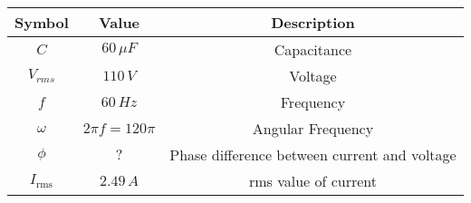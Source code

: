 \begin{tabular}{|c|c|c|}
	\hline
	\textbf{Symbol} & \textbf{Value} &
	\textbf{Description}\\[6pt]
	\hline
	$C$ &  $60\, \mu F$ & Capacitance \\[6pt]
	\hline
	$V_{rms}$ & $110\, V$ & Voltage\\[6pt]
	\hline
	$f$ & $60\, {Hz}$ & Frequency\\[6pt]
	\hline
	$\omega$ & $2\pi f=120\pi$ & Angular Frequency\\[6pt]
	\hline
	$\phi$ & $?$ & Phase difference between current and voltage\\[6pt]
	\hline
	$I_ \text{rms}$ & $2.49\, A$ & rms value of current\\
	\hline
\end{tabular}
